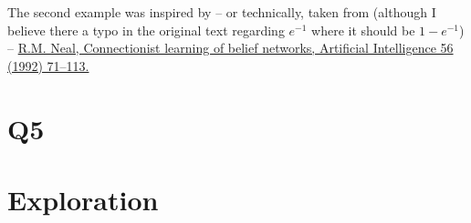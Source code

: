 \documentclass[11pt]{article}
\begin{document}
\noindent The second example was inspired by -- or technically, taken from (although I believe there a typo in the original text regarding $e^{-1}$ where it should be $1 - e^{-1}$) -- \href{http://www.cs.toronto.edu/~bonner/courses/2016s/csc321/readings/Connectionist%20learning%20of%20belief%20networks.pdf}{R.M. Neal, Connectionist learning of belief networks, Artificial Intelligence 56 (1992) 71–113.}


\section*{Q5}

\section*{Exploration}
\end{document}
